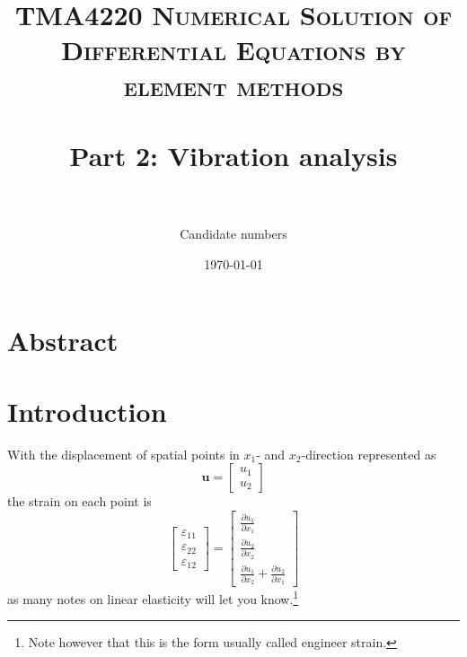 \documentclass[paper=a4, fontsize=11pt]{scrartcl} %
\title{	
\normalfont \normalsize 
\textsc{TMA4220 Numerical Solution of Differential Equations by element methods} \\ [25pt] %
\horrule{0.5pt} \\[0.4cm] %
\huge Part 2: Vibration analysis \\ %
\horrule{2pt} \\[0.5cm] %
}
\author{Candidate numbers} %
\date{\normalsize\today} %
\begin{document}
\maketitle

\section*{Abstract}

\section*{Introduction}
With the displacement of spatial points in $x_1$- and $x_2$-direction represented as
\begin{equation*}
\boldsymbol{u} = \begin{bmatrix}
u_1 \\ u_2
\end{bmatrix}
\end{equation*}
the strain on each point is
\begin{equation*}
\begin{bmatrix}
\varepsilon_{11} \\
\varepsilon_{22} \\
\varepsilon_{12}
\end{bmatrix}
=
\begin{bmatrix}
\frac{\partial u_1}{\partial x_1} \\
\frac{\partial u_2}{\partial x_2} \\
\frac{\partial u_1}{\partial x_2}+\frac{\partial u_2}{\partial x_1}
\end{bmatrix}
\end{equation*}
as many notes on linear elasticity will let you know.\footnote{Note however that this is the form usually called engineer strain.} 
\end{document}
